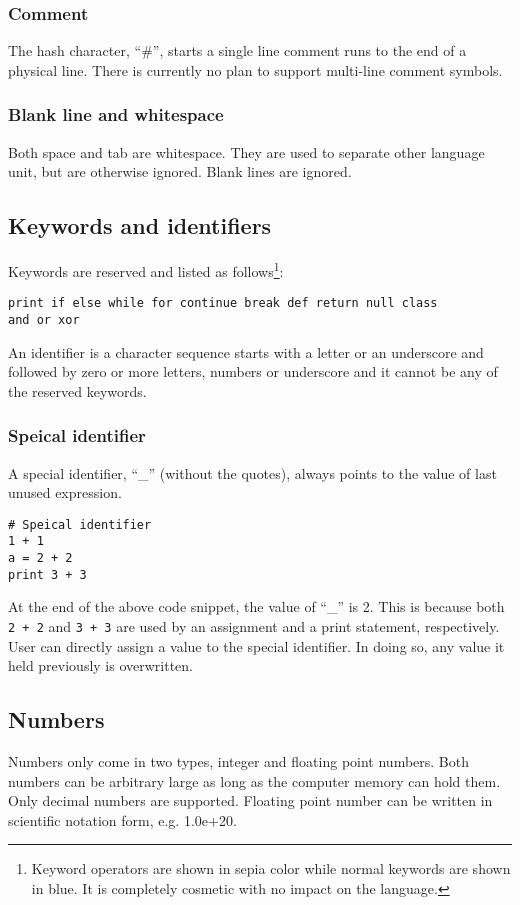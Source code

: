 \documentclass[10pt,a4paper]{article}
\begin{document}
\subsubsection{Comment}
The hash character, ``\#'', starts a single line comment runs to the end
of a physical line. There is currently no plan to support multi-line
comment symbols.

\subsubsection{Blank line and whitespace}
Both space and tab are whitespace. They are used to separate other 
language unit, but are otherwise ignored. Blank lines are ignored.

\subsection{Keywords and identifiers}
Keywords are reserved and listed as follows\footnote{Keyword operators 
are shown in sepia color while normal keywords are shown in blue. It is 
completely cosmetic with no impact on the language.}:
\begin{lstlisting}
print if else while for continue break def return null class 
and or xor 
\end{lstlisting}

An identifier is a character sequence starts with a letter or an underscore 
and followed by zero or more letters, numbers or underscore and it cannot
be any of the reserved keywords.

\subsubsection{Speical identifier}
A special identifier, ``_'' (without the quotes), always points
to the value of last unused expression.
\begin{lstlisting}
# Speical identifier
1 + 1
a = 2 + 2
print 3 + 3
\end{lstlisting}
At the end of the above code snippet, the value of ``_'' is 2. This is because 
both \lstinline$2 + 2$ and \lstinline$3 + 3$ are used by an assignment and
a print statement, respectively. User can directly assign a value to the special
identifier. In doing so, any value it held previously is overwritten.

\subsection{Numbers}
Numbers only come in two types, integer and floating point numbers.
Both numbers can be arbitrary large as long as the computer memory
can hold them. Only decimal numbers are supported. Floating point
number can be written in scientific notation form, e.g. 1.0e+20.
\end{document}
